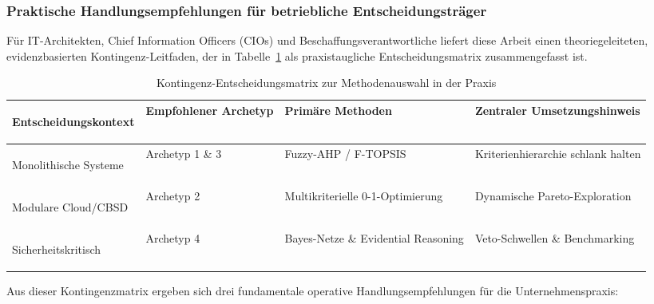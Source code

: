 \subsubsection{Praktische Handlungsempfehlungen für betriebliche Entscheidungsträger}
\label{subsubsec:praktische_handlungsempfehlungen}

Für IT-Architekten, Chief Information Officers (CIOs) und Beschaffungsverantwortliche liefert diese Arbeit einen theoriegeleiteten, evidenzbasierten Kontingenz-Leitfaden, der in Tabelle~\ref{tab:entscheidungsmatrix_praxis} als praxistaugliche Entscheidungsmatrix zusammengefasst ist.

\begin{table}[htbp]
  \centering
  \small
  \caption{Kontingenz-Entscheidungsmatrix zur Methodenauswahl in der Praxis}
  \label{tab:entscheidungsmatrix_praxis}
  \begin{tabularx}{\textwidth}{>{\bfseries\raggedright\arraybackslash}p{3.2cm}>{\raggedright\arraybackslash}p{2.6cm}>{\raggedright\arraybackslash}X>{\raggedright\arraybackslash}p{3.6cm}}
    \toprule
    Entscheidungskontext & Empfohlener Archetyp & Primäre Methoden & Zentraler Umsetzungshinweis \\
    \midrule
    Monolithische Systeme & Archetyp 1 \& 3 & Fuzzy-AHP / F-TOPSIS & Kriterienhierarchie schlank halten \\
    Modulare Cloud/CBSD & Archetyp 2 & Multikriterielle 0-1-Optimierung & Dynamische Pareto-Exploration \\
    Sicherheitskritisch & Archetyp 4 & Bayes-Netze \& Evidential Reasoning & Veto-Schwellen \& Benchmarking \\
    \bottomrule
  \end{tabularx}
\end{table}

Aus dieser Kontingenzmatrix ergeben sich drei fundamentale operative Handlungsempfehlungen für die Unternehmenspraxis:

